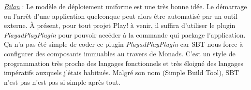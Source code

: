 \underline{\textit{Bilan}} : Le modèle de déploiement uniforme est une très
bonne idée. Le démarrage ou l'arrêt d'une application quelconque peut alors être
 automatisé par un outil externe. 
À présent, pour tout projet Play! à venir, il suffira d'utiliser le plugin
\textit{PlayadPlayPlugin} pour pouvoir accéder à la commande qui package
l'application.
Ça n'a pas été simple de coder ce plugin \textit{PlayadPlayPlugin} car SBT nous
force à configurer des composants immuables au travers de Monads. C'est un style
de programmation très proche des langages fonctionnels et très éloigné des
langages impératifs auxquels j'étais habitués. Malgré son nom (Simple Build
Tool), SBT n'est pas n'est pas si simple après tout.


